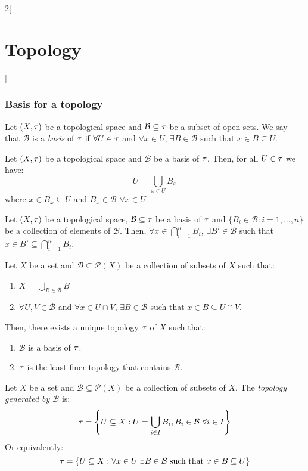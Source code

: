 \documentclass[../../../main.tex]{subfiles}
\begin{document}
\begin{multicols}{2}[\section{Topology}]
  \subsubsection{Basis for a topology}
  \begin{definition}
    Let $(X,\tau)$ be a topological space and $\mathcal{B}\subseteq\tau$ be a subset of open sets. We say that $\mathcal{B}$ is a \emph{basis} of $\tau$ if $\forall U\in\tau$ and $\forall x\in U$, $\exists B\in\mathcal{B}$ such that $x\in B\subseteq U$.
  \end{definition}
  \begin{prop}
    Let $(X,\tau)$ be a topological space and $\mathcal{B}$ be a basis of $\tau$. Then, for all $U\in\tau$ we have: $$U=\bigcup_{x\in U}B_x$$ where $x\in B_x\subseteq U$ and $B_x\in\mathcal{B}$ $\forall x\in U$.
  \end{prop}
  \begin{lemma}
    Let $(X,\tau)$ be a topological space, $\mathcal{B}\subseteq\tau$ be a basis of $\tau$ and $\{B_i\in\mathcal{B}:i=1,\ldots,n\}$ be a collection of elements of $\mathcal{B}$. Then, $\forall x\in\bigcap_{i=1}^nB_i$, $\exists B'\in\mathcal{B}$ such that $x\in B'\subseteq\bigcap_{i=1}^nB_i$.
  \end{lemma}
  \begin{prop}
    Let $X$ be a set and $\mathcal{B}\subseteq\mathcal{P}(X)$ be a collection of subsets of $X$ such that:
    \begin{enumerate}
      \renewcommand{\labelenumi}{\alph{enumi})}
      \item $\displaystyle X=\bigcup_{B\in\mathcal{B}} B$
      \item $\forall U,V\in\mathcal{B}$ and  $\forall x\in U\cap V$, $\exists B\in\mathcal{B}$ such that $x\in B\subseteq U\cap V$.
    \end{enumerate}
    Then, there exists a unique topology $\tau$ of $X$ such that:
    \begin{enumerate}
      \item $\mathcal{B}$ is a basis of $\tau$.
      \item $\tau$ is the least finer topology that contains $\mathcal{B}$.
    \end{enumerate}
  \end{prop}
  \begin{definition}
    Let $X$ be a set and $\mathcal{B}\subseteq\mathcal{P}(X)$ be a collection of subsets of $X$. The \emph{topology generated by $\mathcal{B}$} is: $$\tau=\left\{U\subseteq X:U=\bigcup_{i\in I}B_i, B_i\in \mathcal{B}\ \forall i\in I\right\}$$ Or equivalently: $$\tau=\left\{U\subseteq X:\forall x\in U\;\exists B\in\mathcal{B}\text{ such that }x\in B\subseteq U\right\}$$

\end{definition}
\end{multicols}
\end{document}
